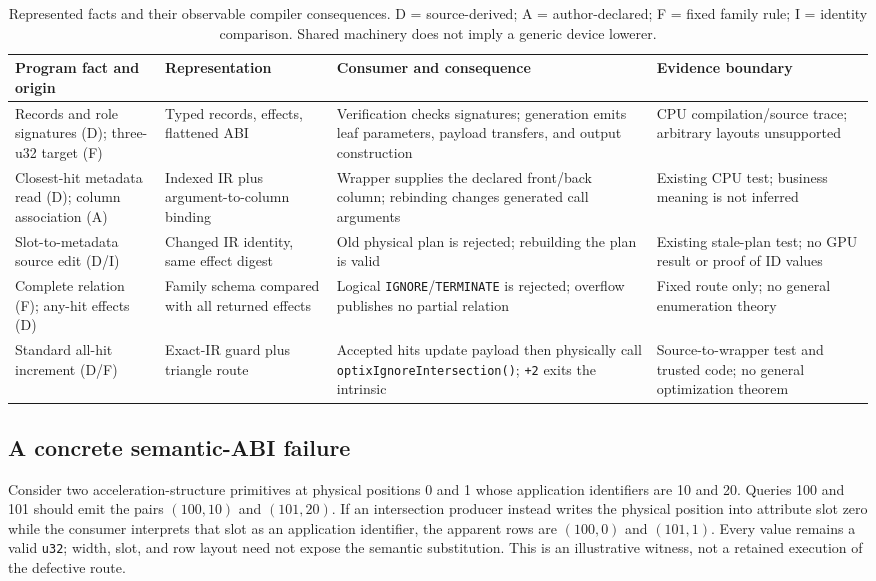 \documentclass[sigplan,screen,review,anonymous]{acmart}
\begin{document}
\begin{table}[t]
  \caption{Represented facts and their observable compiler consequences.
  D = source-derived; A = author-declared; F = fixed family rule; I = identity
  comparison. Shared machinery does not imply a generic device lowerer.}
  \label{tab:result-route}
  \scriptsize
  \begin{tabularx}{\textwidth}{@{}p{}p{}p{}X@{}}
    \toprule
    Program fact and origin & Representation & Consumer and consequence & Evidence boundary \\
    \midrule
    Records and role signatures (D); three-u32 target (F) & Typed records,
    effects, flattened ABI & Verification checks signatures; generation emits
    leaf parameters, payload transfers, and output construction & CPU
    compilation/source trace; arbitrary layouts unsupported \\
    Closest-hit metadata read (D); column association (A) & Indexed IR plus
    argument-to-column binding & Wrapper supplies the declared front/back
    column; rebinding changes generated call arguments & Existing CPU test;
    business meaning is not inferred \\
    Slot-to-metadata source edit (D/I) & Changed IR identity, same effect digest
    & Old physical plan is rejected; rebuilding the plan is valid & Existing
    stale-plan test; no GPU result or proof of ID values \\
    Complete relation (F); any-hit effects (D) & Family schema compared with all
    returned effects & Logical \texttt{IGNORE}/\texttt{TERMINATE} is rejected;
    overflow publishes no partial relation & Fixed route only; no general
    enumeration theory \\
    Standard all-hit increment (D/F) & Exact-IR guard plus triangle route &
    Accepted hits update payload then physically call
    \texttt{optixIgnoreIntersection()}; \texttt{+2} exits the intrinsic &
    Source-to-wrapper test and trusted code; no general optimization theorem \\
    \bottomrule
  \end{tabularx}
\end{table}

\subsection{A concrete semantic-ABI failure}

Consider two acceleration-structure primitives at physical positions 0 and 1
whose application identifiers are 10 and 20. Queries 100 and 101 should emit
the pairs $(100,10)$ and $(101,20)$. If an intersection producer instead writes
the physical position into attribute slot zero while the consumer interprets
that slot as an application identifier, the apparent rows are $(100,0)$ and
$(101,1)$. Every value remains a valid \texttt{u32}; width, slot, and row layout
need not expose the semantic substitution. This is an illustrative witness, not
a retained execution of the defective route.
\end{document}
